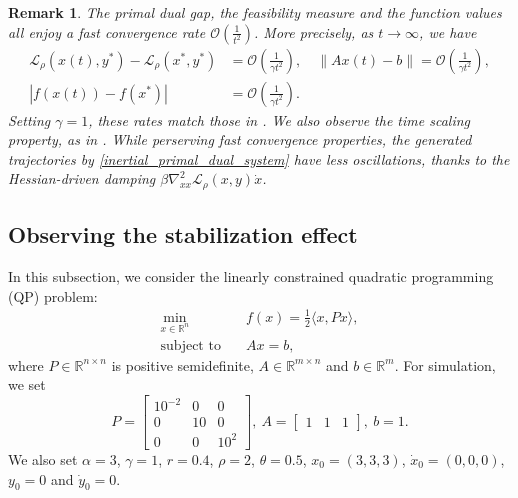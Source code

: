 \documentclass[pdflatex,sn-mathphys-num]{sn-jnl}
\theoremstyle{thmstyleone}
\theoremstyle{thmstyletwo}
\newtheorem{remark}[theorem]{Remark}
\theoremstyle{thmstylethree}
\newcommand{\R}{\mathbb{R}}
\begin{document}
\begin{remark}
The primal dual gap, the feasibility measure and the function values all enjoy a fast convergence rate $\mathcal{O}\left( \frac{1}{t^2} \right)$. More precisely, as $t\to\infty$, we have
\begin{align*}
\mathcal{L}_\rho\left(x(t),y^*\right) - \mathcal{L}_\rho(x^*,y^*)
&= \mathcal{O}\left( \tfrac{1}{\gamma t^2} \right),\quad
\|Ax(t)-b\|
= \mathcal{O}\left( \tfrac{1}{\gamma t^2} \right),\\
|f\left( x(t) \right) - f(x^*) |
&= \mathcal{O}\left( \tfrac{1}{\gamma t^2} \right).
\end{align*}
Setting $\gamma=1$, these rates match those in \cite{Radu_2021}. We also observe the time scaling property, as in \cite{Attouch_2022_ADMM,Hulett_2023}. While perserving fast convergence properties, the generated trajectories by \eqref{inertial_primal_dual_system} have less oscillations, thanks to the Hessian-driven damping $\beta\nabla^2_{xx}\mathcal{L}_\rho \left( x, y \right) \dot{x}$.  
\end{remark}




\subsection{Observing the stabilization effect}\label{Sec: example}
In this subsection, we consider the linearly constrained quadratic programming (QP) problem:
\begin{equation*}
\begin{aligned}
\min_{x\in\R^n}&\quad f(x) = \frac{1}{2}\langle x, P x\rangle , \\
\text{subject to}&\quad Ax=b,
\end{aligned}
\end{equation*}
where $P\in\R^{n\times n}$ is positive semidefinite, $A\in\R^{m\times n}$ and $b\in\R^m$. For simulation, we set 
\begin{equation*}
P = \begin{bmatrix}
10^{-2} & 0 & 0 \\
0 & 10 & 0\\
0 & 0 & 10^{2}
\end{bmatrix},\ 
A = \begin{bmatrix}
1 & 1 & 1
\end{bmatrix},\  
b = 1.
\end{equation*}
We also set $\alpha=3$, $\gamma=1$, $r=0.4$, $\rho=2$, $\theta = 0.5$, $x_0 = (3,3,3)$, $\dot{x}_0 = (0,0,0)$, $y_0 = 0$ and $\dot{y}_0 = 0$. 
\end{document}
